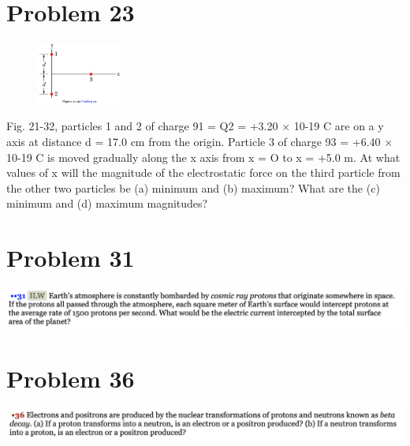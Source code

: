 \documentclass[12pt]{article}
\begin{document}
\section*{Problem 23}
\begin{figure}
    \vspace{-30pt}
    \includegraphics[width=0.25\textwidth]{picture_6.png} 
\end{figure}
Fig. 21-32, particles 1 and 2 of charge 91 = Q2 = +3.20 × 10-19 C are on a y axis at distance d = 17.0 cm from the origin. Particle 3 of charge 93 = +6.40 × 10-19 C is moved gradually along the x axis from x = O to x = +5.0 m. At what values of x will the magnitude of the electrostatic force on the third particle from the other two particles be (a) minimum and (b) maximum? What are the (c) minimum and (d) maximum magnitudes?

\pagebreak
\section*{Problem 31}
\includegraphics[width=\textwidth]{picture_7.png} 

\pagebreak
\section*{Problem 36}
\includegraphics[width=\textwidth]{picture_8.png} 
\end{document}
